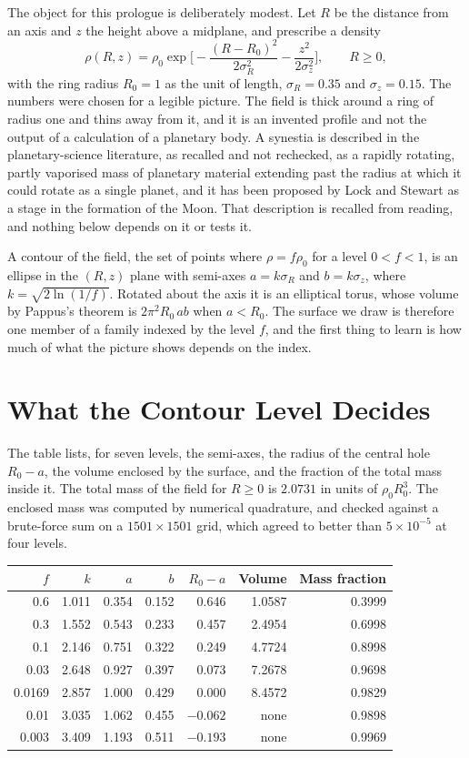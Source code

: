 The object for this prologue is deliberately modest. Let $R$ be the distance from an axis and $z$ the height above a midplane, and prescribe a density
\[
  \rho(R,z)=\rho_0\exp\!\Big[-\frac{(R-R_0)^2}{2\sigma_R^2}-\frac{z^2}{2\sigma_z^2}\Big],\qquad R\ge0,
\]
with the ring radius $R_0=1$ as the unit of length, $\sigma_R=0.35$ and $\sigma_z=0.15$. The numbers were chosen for a legible picture. The field is thick around a ring of radius one and thins away from it, and it is an invented profile and not the output of a calculation of a planetary body. A synestia is described in the planetary-science literature, as recalled and not rechecked, as a rapidly rotating, partly vaporised mass of planetary material extending past the radius at which it could rotate as a single planet, and it has been proposed by Lock and Stewart as a stage in the formation of the Moon. That description is recalled from reading, and nothing below depends on it or tests it.

A contour of the field, the set of points where $\rho=f\rho_0$ for a level $0<f<1$, is an ellipse in the $(R,z)$ plane with semi-axes $a=k\sigma_R$ and $b=k\sigma_z$, where $k=\sqrt{2\ln(1/f)}$. Rotated about the axis it is an elliptical torus, whose volume by Pappus's theorem is $2\pi^2R_0\,ab$ when $a<R_0$. The surface we draw is therefore one member of a family indexed by the level $f$, and the first thing to learn is how much of what the picture shows depends on the index.

\section*{What the Contour Level Decides}

The table lists, for seven levels, the semi-axes, the radius of the central hole $R_0-a$, the volume enclosed by the surface, and the fraction of the total mass inside it. The total mass of the field for $R\ge0$ is $2.0731$ in units of $\rho_0R_0^3$. The enclosed mass was computed by numerical quadrature, and checked against a brute-force sum on a $1501\times1501$ grid, which agreed to better than $5\times10^{-5}$ at four levels.

\begin{center}
\begin{tabular}{rrrrrrr}
\toprule
$f$ & $k$ & $a$ & $b$ & $R_0-a$ & Volume & Mass fraction\\
\midrule
0.6    & 1.011 & 0.354 & 0.152 & 0.646  & 1.0587 & 0.3999\\
0.3    & 1.552 & 0.543 & 0.233 & 0.457  & 2.4954 & 0.6998\\
0.1    & 2.146 & 0.751 & 0.322 & 0.249  & 4.7724 & 0.8998\\
0.03   & 2.648 & 0.927 & 0.397 & 0.073  & 7.2678 & 0.9698\\
0.0169 & 2.857 & 1.000 & 0.429 & 0.000  & 8.4572 & 0.9829\\
0.01   & 3.035 & 1.062 & 0.455 & $-0.062$ & none & 0.9898\\
0.003  & 3.409 & 1.193 & 0.511 & $-0.193$ & none & 0.9969\\
\bottomrule
\end{tabular}
\end{center}

